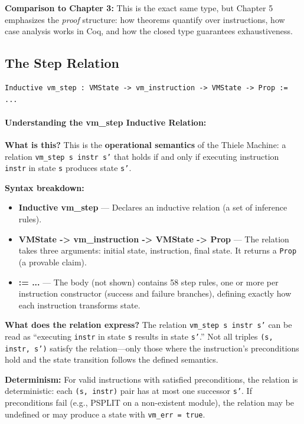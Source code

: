\textbf{Comparison to Chapter 3:} This is the exact same type, but Chapter 5 emphasizes the \textit{proof} structure: how theorems quantify over instructions, how case analysis works in Coq, and how the closed type guarantees exhaustiveness.

\subsection{The Step Relation}

\begin{lstlisting}
Inductive vm_step : VMState -> vm_instruction -> VMState -> Prop := ...
\end{lstlisting}

\paragraph{Understanding the vm\_step Inductive Relation:}

\textbf{What is this?} This is the \textbf{operational semantics} of the Thiele Machine: a relation \texttt{vm\_step s instr s'} that holds if and only if executing instruction \texttt{instr} in state \texttt{s} produces state \texttt{s'}.

\textbf{Syntax breakdown:}
\begin{itemize}
    \item \textbf{Inductive vm\_step} — Declares an inductive relation (a set of inference rules).
    \item \textbf{VMState -> vm\_instruction -> VMState -> Prop} — The relation takes three arguments: initial state, instruction, final state. It returns a \texttt{Prop} (a provable claim).
    \item \textbf{:= ...} — The body (not shown) contains 58 step rules, one or more per instruction constructor (success and failure branches), defining exactly how each instruction transforms state.
\end{itemize}

\textbf{What does the relation express?} The relation \texttt{vm\_step s instr s'} can be read as ``executing \texttt{instr} in state \texttt{s} results in state \texttt{s'}.'' Not all triples \texttt{(s, instr, s')} satisfy the relation---only those where the instruction's preconditions hold and the state transition follows the defined semantics.

\textbf{Determinism:} For valid instructions with satisfied preconditions, the relation is deterministic: each \texttt{(s, instr)} pair has at most one successor \texttt{s'}. If preconditions fail (e.g., PSPLIT on a non-existent module), the relation may be undefined or may produce a state with \texttt{vm\_err = true}.

